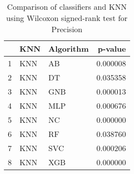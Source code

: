 \begin{table}
\footnotesize
\caption{Comparison of classifiers and KNN using Wilcoxon signed-rank test for Precision}
\label{tab:KNN wilcoxon Precision comparison}
\begin{tabular}{lllr}
\hline
 & KNN & Algorithm & p-value \\
\hline
1 & KNN & AB & 0.000008 \\
2 & KNN & DT & 0.035358 \\
3 & KNN & GNB & 0.000013 \\
4 & KNN & MLP & 0.000676 \\
5 & KNN & NC & 0.000000 \\
6 & KNN & RF & 0.038760 \\
7 & KNN & SVC & 0.000206 \\
8 & KNN & XGB & 0.000000 \\
\hline
\end{tabular}
\end{table}
